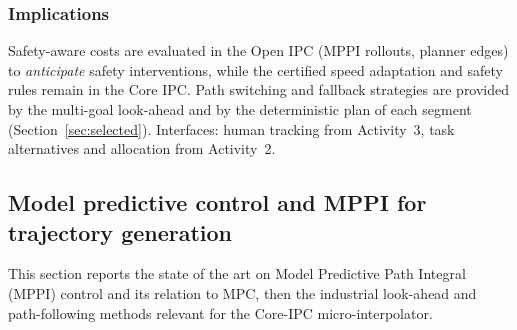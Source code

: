 \documentclass{plan4ari_report}
\begin{document}
\subsubsection{Implications}
Safety-aware costs are evaluated in the Open IPC (MPPI rollouts, planner edges) to \emph{anticipate} safety interventions, while the certified speed adaptation and safety rules remain in the Core IPC. Path switching and fallback strategies are provided by the multi-goal look-ahead and by the deterministic plan of each segment (Section~\ref{sec:selected}). Interfaces: human tracking from Activity~3, task alternatives and allocation from Activity~2.

\subsection{Model predictive control and MPPI for trajectory generation}\label{sec:mpc}

This section reports the state of the art on Model Predictive Path Integral (MPPI) control and its relation to MPC, then the industrial look-ahead and path-following methods relevant for the Core-IPC micro-interpolator.

\begingroup
\let\section\subsubsection
\let\subsection\paragraph
\renewcommand{\paragraph}[1]{\par\runin{#1}}

\endgroup
\end{document}
